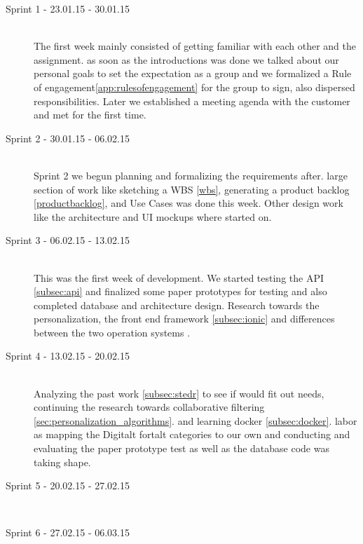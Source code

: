 \begin{description}
	
	\item[Sprint 1 - 23.01.15 - 30.01.15] \hfill \\ 
	The first week mainly consisted of getting familiar with each other and the assignment. as soon as the introductions was done we talked about our personal goals to set the expectation as a group and we formalized a Rule of engagement\ref{app:rulesofengagement} for the group to sign, also dispersed responsibilities. Later we established a meeting agenda with the customer and met for the first time.
	
	\item[Sprint 2 - 30.01.15 - 06.02.15] \hfill \\ 
	Sprint 2 we begun planning and formalizing the requirements after. large section of work like sketching a WBS \ref{wbs}, generating a product backlog \ref{productbacklog}, and Use Cases was done this week. Other design work like the architecture and UI mockups where started on.
	
	\item[Sprint 3 - 06.02.15 - 13.02.15] \hfill \\ 
	This was the first week of development. We started testing the API \ref{subsec:api} and finalized some paper prototypes for testing  and also completed database and architecture design. Research towards the personalization, the front end framework \ref{subsec:ionic}  and differences between the two operation systems . 
	
	\item[Sprint 4 - 13.02.15 - 20.02.15] \hfill \\ 
	Analyzing the past work \ref{subsec:stedr} to see if would fit out needs, continuing the research towards collaborative filtering \ref{sec:personalization_algorithms}. and learning docker \ref{subsec:docker}. labor as mapping the Digitalt fortalt  categories to our own and conducting and evaluating the paper prototype test as well as the database code was taking shape.
	
	\item[Sprint 5 - 20.02.15 - 27.02.15] \hfill \\ 
	
		
	\item[Sprint 6 - 27.02.15 - 06.03.15] \hfill \\ 


\end{description}
